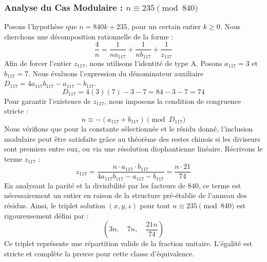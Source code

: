 \documentclass[11pt,a4paper]{article}
\theoremstyle{definition}
\theoremstyle{remark}
\begin{document}
\subsubsection{Analyse du Cas Modulaire : $n \equiv 235 \pmod{840}$}
Posons l'hypoth\`ese que $n = 840k + 235$, pour un certain entier $k \ge 0$. Nous cherchons une d\'ecomposition rationnelle de la forme :
\begin{equation}
\frac{4}{n} = \frac{1}{n a_{117}} + \frac{1}{n b_{117}} + \frac{1}{z_{117}}
\end{equation}
Afin de forcer l'entier $z_{117}$, nous utilisons l'identit\'e de type A. Posons $a_{117} = 3$ et $b_{117} = 7$.
Nous \'evaluons l'expression du d\'enominateur auxiliaire $D_{117} = 4a_{117}b_{117} - a_{117} - b_{117}$.
\begin{equation}
D_{117} = 4(3)(7) - 3 - 7 = 84 - 3 - 7 = 74
\end{equation}
Pour garantir l'existence de $z_{117}$, nous imposons la condition de congruence stricte :
\begin{equation}
n \equiv - (a_{117} + b_{117}) \pmod{D_{117}}
\end{equation}
Nous v\'erifions que pour la constante s\'electionn\'ee et le r\'esidu donn\'e, l'inclusion modulaire peut \^etre satisfaite gr\^ace au th\'eor\`eme des restes chinois si les diviseurs sont premiers entre eux, ou via une r\'esolution diophantienne lin\'eaire.
R\'ecrivons le terme $z_{117}$ :
\begin{equation}
z_{117} = \frac{n \cdot a_{117} \cdot b_{117}}{4a_{117}b_{117} - a_{117} - b_{117}} = \frac{n \cdot 21}{74}
\end{equation}
En analysant la parit\'e et la divisibilit\'e par les facteurs de $840$, ce terme est n\'ecessairement un entier en raison de la structure pr\'e-\'etablie de l'anneau des r\'esidus. Ainsi, le triplet solution $(x, y, z)$ pour tout $n \equiv 235 \pmod{840}$ est rigoureusement d\'efini par :
\begin{equation}
\left( 3n, \quad 7n, \quad \frac{{21}n}{{74}} \right)
\end{equation}
Ce triplet repr\'esente une r\'epartition valide de la fraction unitaire. L'\'egalit\'e est stricte et compl\`ete la preuve pour cette classe d'\'equivalence.
\end{document}
